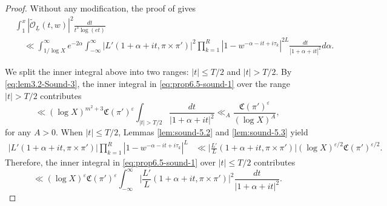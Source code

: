 \documentclass[12pt,reqno]{amsart}
\theoremstyle{remark}
\numberwithin{equation}{section}
\begin{document}
	\begin{proof}
        Without any modification, the proof of \cite[Proposition 6.5]{S} gives  
    \begin{equation}\label{eq:prop6.5-sound-1}
		\begin{aligned}
                &\int_1^x|\widetilde{\mathcal{O}}_{\underline{L}}(t,w)|^{2} \frac{dt}{t^3\log(et)}\\ 
                &\quad \ll \int_{1/\log X}^\infty e^{-2\alpha}\int_{-\infty}^{\infty} |L'(1+\alpha+it, \pi \times \pi')|^2\prod_{k=1}^{R} |1- w^{-\alpha-it+i\tau_k}|^{2L} \frac{dt}{|1+\alpha+it|^2} d\alpha. 
			\end{aligned}
		\end{equation}
  
	We split the inner integral above into two ranges: $|t| \le T/2$ and $|t| > T/2$. 
    By \eqref{eq:lem3.2-Sound-3}, the inner integral in \eqref{eq:prop6.5-sound-1} over the range $|t| > T/2$ contributes 
  \begin{equation}
            \label{eq:prop6.5-sound-geT/2}
		\ll (\log X)^{m^2+3} \mathfrak{C}(\pi')^\varepsilon \int_{|t| > T/2} \frac{dt}{|1+\alpha+it|^2} \ll_A  \frac{\mathfrak{C}(\pi')^\varepsilon}{(\log X)^A},
		\end{equation}
        for any $A > 0$.
        When $|t|\leq T/2$, Lemmas \ref{lem:sound-5.2} and \ref{lem:sound-5.3} yield 
    \begin{equation*}
	\begin{aligned}
        |L'(1+\alpha+it, \pi \times \pi')|\prod_{k=1}^{R} |1- w^{-\alpha-it+i\tau_k}|^{L} 
	&
        \ll \Big|\frac{L'}{L}(1+\alpha+it, \pi \times \pi')\Big| (\log X)^{\varepsilon/2}\mathfrak{C}(\pi')^{\varepsilon/2}.
	\end{aligned}
    \end{equation*}
    Therefore, the inner integral in \eqref{eq:prop6.5-sound-1} over $|t|\leq T/2$ contributes 
		\begin{equation}\label{eq:prop6.5-sound-3}
			\ll (\log X)^{\varepsilon} \mathfrak{C}(\pi')^{\varepsilon}\int_{-\infty}^{\infty} \Big|\frac{L'}{L}(1+\alpha+it, \pi \times \pi')\Big|^2 \frac{dt}{|1+\alpha+it|^2}.
		\end{equation}


\end{proof}
\end{document}
